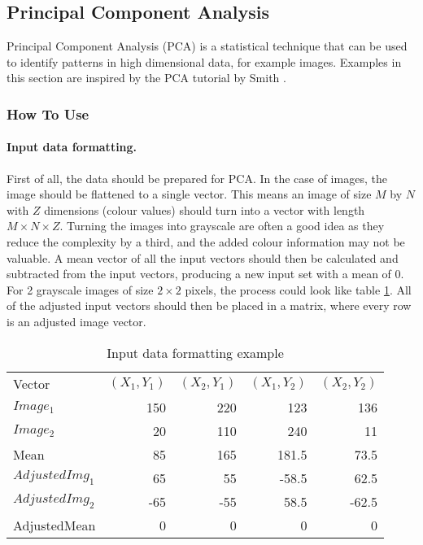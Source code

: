 \subsection{Principal Component Analysis}
\label{sec:PCA}
Principal Component Analysis (PCA) is a statistical technique that can be used to identify patterns in high dimensional data, for example images.
Examples in this section are inspired by the PCA tutorial by Smith \cite{smith2002tutorial}.

\subsubsection{How To Use}
\paragraph{Input data formatting.}
First of all, the data should be prepared for PCA.
In the case of images, the image should be flattened to a single vector.
This means an image of size $M$ by $N$ with $Z$ dimensions (colour values) should turn into a vector with length $M\times N\times Z$.
Turning the images into grayscale are often a good idea as they reduce the complexity by a third, and the added colour information may not be valuable.
A mean vector of all the input vectors should then be calculated and subtracted from the input vectors, producing a new input set with a mean of 0.
For 2 grayscale images of size $2\times 2$ pixels, the process could look like table \ref{tab:formattingexample}.
All of the adjusted input vectors should then be placed in a matrix, where every row is an adjusted image vector.

\begin{table}
\caption{Input data formatting example}\label{tab:formattingexample}
\begin{tabular}{l|rrrr}
\hline
\noalign{\smallskip}
Vector & $(X_1, Y_1)$ & $(X_2, Y_1)$ & $(X_1, Y_2)$ & $(X_2, Y_2)$\\
\noalign{\smallskip}
\hline
\noalign{\smallskip}
$Image_1$ & 150 & 220 & 123 & 136 \\
$Image_2$ & 20 & 110 & 240 & 11 \\
Mean & 85 & 165 & 181.5 & 73.5 \\
$AdjustedImg_1$ & 65  & 55 & -58.5 & 62.5 \\
$AdjustedImg_2$ & -65 & -55 & 58.5 & -62.5 \\
AdjustedMean & 0 & 0 & 0 & 0 \\
\hline
\end{tabular}
\end{table}

